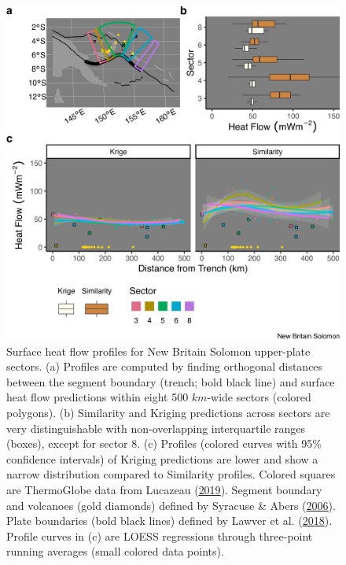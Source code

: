 \begin{figure}[htbp]

{\centering \includegraphics[width=1\linewidth,]{assets/figs/chpt3/NewBritainSolomonUpperPlate} 

}

\caption[Surface heat flow profiles for New Britain Solomon upper-plate sectors]{Surface heat flow profiles for New Britain Solomon upper-plate sectors. (a) Profiles are computed by finding orthogonal distances between the segment boundary (trench; bold black line) and surface heat flow predictions within eight 500 \(km\)-wide sectors (colored polygons). (b) Similarity and Kriging predictions across sectors are very distinguishable with non-overlapping interquartile ranges (boxes), except for sector 8. (c) Profiles (colored curves with 95\% confidence intervals) of Kriging predictions are lower and show a narrow distribution compared to Similarity profiles. Colored squares are ThermoGlobe data from Lucazeau (\protect\hyperlink{ref-lucazeau2019}{2019}). Segment boundary and volcanoes (gold diamonds) defined by Syracuse \& Abers (\protect\hyperlink{ref-syracuse2006}{2006}). Plate boundaries (bold black lines) defined by Lawver et al. (\protect\hyperlink{ref-lawver2018}{2018}). Profile curves in (c) are LOESS regressions through three-point running averages (small colored data points).}\label{fig:newBritainSolomonUpper}
\end{figure}

